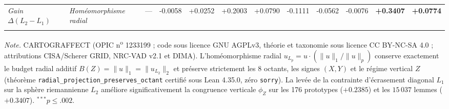 \begin{table}[htbp]
\begin{threeparttable}
\begin{tabular}{l l r ccc cc cccc}
\textit{Gain $\Delta(L_2 - L_1)$} & \textit{Homéomorphisme radial} & --- & -0.0058 & +0.0252 & +0.2003 & +0.0790 & -0.1111 & -0.0562 & -0.0076 & \textbf{+0.3407} & \textbf{+0.0774} \\
\addlinespace[3pt]
\bottomrule
\end{tabular}
\begin{tablenotes}
\footnotesize
\textit{Note.} CARTOGRAFFECT\textsuperscript{\textregistered} (OPIC n\textsuperscript{o} 1233199 ; code sous licence GNU AGPLv3, théorie et taxonomie sous licence CC BY-NC-SA 4.0 ; attributions CISA/Scherer GRID, NRC-VAD v2.1 et DIMA). L'homéomorphisme radial $u_{L_p} = u \cdot (\|u\|_1 / \|u\|_p)$ conserve exactement le budget radial additif $B(Z) = \|u\|_1 = \|u_{L_2}\|_2$ et préserve strictement les 8 octants, les signes $(X, Y)$ et le régime vertical $Z$ (théorème \texttt{radial\_projection\_preserves\_octant} certifié sous Lean 4.35.0, zéro \texttt{sorry}). La levée de la contrainte d'écrasement diagonal $L_1$ sur la sphère riemannienne $L_2$ améliore significativement la congruence verticale $\phi_Z$ sur les 176 prototypes ($+0.2385$) et les $15\,037$ lemmes ($+0.3407$). $^{***}p \le .002$.
\end{tablenotes}
\end{threeparttable}
\end{table}
